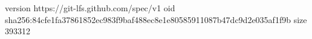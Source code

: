 version https://git-lfs.github.com/spec/v1
oid sha256:84cfe1fa37861852ec983f9baf488ec8e1e80585911087b47dc9d2e035af1f9b
size 393312
